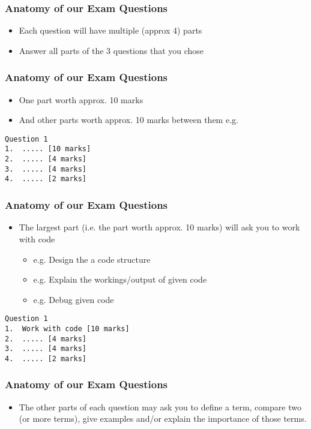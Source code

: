 \documentclass{beamer}
\begin{document}
\begin{frame}[fragile]
\frametitle{Anatomy of our Exam Questions}
\begin{itemize}
\item Each question will have multiple (approx 4) parts
\item Answer all parts of the 3 questions that you chose
\end{itemize}
\end{frame}

\begin{frame}[fragile]
\frametitle{Anatomy of our Exam Questions}
\begin{itemize}
\item One part worth approx. 10 marks
\item And other parts worth approx. 10 marks between them e.g.
\end{itemize}

\begin{block}{}
\begin{lstlisting}
Question 1
1.  ..... [10 marks]
2.  ..... [4 marks]
3.  ..... [4 marks]
4.  ..... [2 marks]
\end{lstlisting}
\end{block}
\end{frame}

\begin{frame}[fragile]
\frametitle{Anatomy of our Exam Questions}
\begin{itemize}
\item The largest part (i.e. the part worth approx. 10 marks) will ask you to work with code
\begin{itemize}
\item e.g. Design the a code structure
\item e.g. Explain the workings/output of given code
\item e.g. Debug given code
\end{itemize}
\end{itemize}

\begin{block}{}
\begin{lstlisting}
Question 1
1.  Work with code [10 marks]
2.  ..... [4 marks]
3.  ..... [4 marks]
4.  ..... [2 marks]
\end{lstlisting}
\end{block}
\end{frame}

\begin{frame}[fragile]
\frametitle{Anatomy of our Exam Questions}
\begin{itemize}
\item The other parts of each question may ask you to define a term, compare two (or more terms), give examples and/or explain the importance of those terms.
\end{itemize}
\end{frame}
\end{document}
